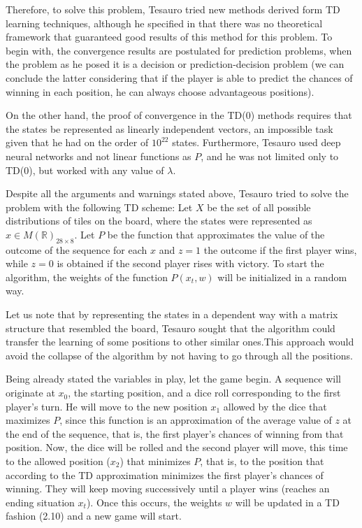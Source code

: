 \documentclass[12pt]{article}
\numberwithin{equation}{section}
\begin{document}
Therefore, to solve this problem, Tesauro tried new methods \cite{tesauro1992temporal} \cite{tesauro1994td} derived form TD  learning techniques, although he specified in \cite{tesauro1992temporal} that there was no theoretical framework that guaranteed good results of this method for this problem. To begin with,  the convergence results are postulated for prediction problems, when the problem as he  posed it is a decision or prediction-decision problem (we can conclude the latter considering that if the player is able to predict the chances of winning in each position, he can always choose advantageous positions).



On the other hand, the proof of convergence in the TD(0) methods requires that the states be represented as linearly independent vectors, an impossible task given that he had on the order of $10^{22}$ states. Furthermore, Tesauro used deep neural networks and not linear functions as $P$, and he was not limited only to TD(0), but worked with any value of $\lambda$.





Despite all the arguments and warnings stated above, Tesauro tried to solve the problem with the following TD scheme: Let $X$  be the set of all possible distributions of tiles on the board, where the states were represented as $x\in M(\mathbb{R})_{28 \times 8}$. Let $P$ be the function that approximates the value of the outcome of the sequence for each $x$ and $z=1$ the outcome if the first player wins, while $z=0$ is obtained if the second player rises with victory.  To start the algorithm, the weights of the function $P(x_t,w)$  will be initialized in a random way. 


 Let us note that by representing the states in a dependent way with a matrix structure that resembled the board, Tesauro sought that the algorithm could transfer the learning of some positions to other similar ones.This approach would avoid the collapse of the algorithm by not having to go through all the positions.


Being already stated the variables in play, let the game begin. A sequence will originate at $x_0$, the starting position, and a dice roll corresponding to the first player's turn. He will move to the new position $x_1$ allowed by the dice that maximizes $P$, since this function is an approximation of the average value of $z$ at the end of the sequence, that is, the first player's chances of winning from that position. Now, the dice will be rolled and the second player will move, this time to the allowed position  ($x_2$) that minimizes $P$, that is, to the position that according to the TD approximation minimizes the first player's chances of winning. They will keep moving successively until a player wins (reaches an ending situation $x_t$). Once this occurs, the weights $w$  will be updated in a TD fashion (2.10) and a new game will start.
\end{document}
